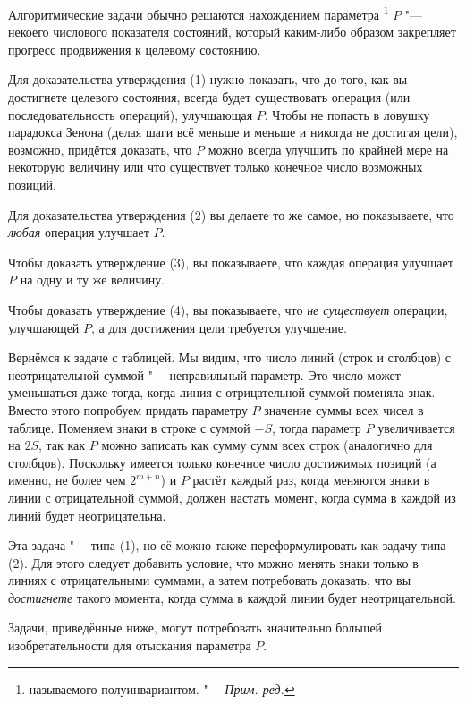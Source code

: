 \documentclass[twoside]{book}
\begin{document}
Алгоритмические задачи обычно решаются нахождением параметра%
\footnote{называемого полуинвариантом. "--- \emph{Прим. ред.}}
$P$ "--- некоего числового показателя состояний, который каким-либо образом закрепляет прогресс продвижения к целевому состоянию.

Для доказательства утверждения (1) нужно показать, что до того, как вы достигнете целевого состояния, всегда будет существовать операция (или последовательность операций), улучшающая $P$.
Чтобы не попасть в ловушку парадокса Зенона (делая шаги всё меньше и меньше и никогда не достигая цели), возможно, придётся доказать, что $P$ можно всегда улучшить по крайней мере на некоторую величину или что существует только конечное число возможных позиций.

Для доказательства утверждения (2) вы делаете то же самое, но показываете, что \emph{любая} операция улучшает $P$.

Чтобы доказать утверждение (3), вы показываете, что каждая операция улучшает $P$ на одну и ту же величину.

Чтобы доказать утверждение (4), вы показываете, что \emph{не существует} операции, улучшающей $P$, а для достижения цели требуется улучшение.

\medskip

Вернёмся к задаче с таблицей.
Мы видим, что число линий (строк и столбцов) с неотрицательной суммой "--- неправильный параметр.
Это число может уменьшаться даже тогда, когда линия с отрицательной суммой поменяла знак.
Вместо этого попробуем придать параметру $P$ значение суммы всех чисел в таблице.
Поменяем знаки в строке с суммой $-S$, тогда параметр $P$ увеличивается на $2S$, так как $P$ можно записать как сумму сумм всех строк (аналогично для столбцов).
Поскольку имеется только конечное число достижимых позиций
(а именно, не более чем $2^{m+n}$) и $P$ растёт каждый раз, когда меняются знаки в линии с отрицательной суммой, должен настать момент, когда сумма в каждой из линий будет неотрицательна.

Эта задача "--- типа (1), но её можно также переформулировать как задачу типа (2).
Для этого следует добавить условие, что можно менять знаки только в линиях с отрицательными суммами, а затем потребовать доказать, что вы \emph{достигнете} такого момента, когда сумма в каждой линии будет неотрицательной.

\medskip

{
\sloppy

Задачи, приведённые ниже, могут потребовать значительно большей изобретательности для отыскания параметра $P$.

}
\end{document}
